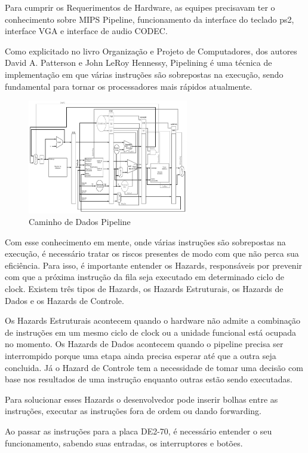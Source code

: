 \documentclass{vgtc}                          %
\begin{document}
Para cumprir os Requerimentos de Hardware, as equipes precisavam ter o conhecimento sobre MIPS Pipeline, funcionamento da interface do teclado ps2, interface VGA e interface de audio CODEC.

Como explicitado no livro Organização e Projeto de Computadores\cite{ware:2004:IVP}, dos autores David A. Patterson e John LeRoy Hennessy, Pipelining é uma técnica de implementação em que várias instruções são sobrepostas na execução, sendo fundamental para tornar os processadores mais rápidos atualmente. 

\begin{figure}[htb]
  \centering
  \includegraphics[width=2.76in]{pipeline.jpg}
 \caption{Caminho de Dados Pipeline}
\end{figure}

 
Com esse conhecimento em mente, onde várias instruções são sobrepostas na execução, é necessário tratar os riscos presentes de modo com que não perca sua eficiência. Para isso, é importante entender os Hazards, responsáveis por prevenir com que a próxima instrução da fila seja executado em determinado ciclo de clock. Existem três tipos de Hazards, os Hazards Estruturais, os Hazards de Dados e os Hazards de Controle.

Os Hazards Estruturais acontecem quando o hardware não admite a combinação de instruções em um mesmo ciclo de clock ou a unidade funcional está ocupada no momento. Os Hazards de Dados acontecem quando o pipeline precisa ser interrompido porque uma etapa ainda precisa esperar até que a outra seja concluida. Já o Hazard de Controle tem a necessidade de tomar uma decisão com base nos resultados de uma instrução enquanto outras estão sendo executadas.

Para solucionar esses Hazards o desenvolvedor pode inserir bolhas entre as instruções, executar as instruções fora de ordem ou dando forwarding.

Ao passar as instruções para a placa DE2-70, é necessário entender o seu funcionamento, sabendo suas entradas, os interruptores e botões.
\end{document}
